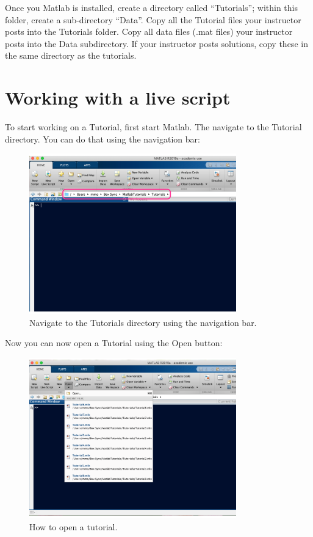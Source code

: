 \documentclass[11pt]{article}
\begin{document}
\vspace{2mm}
\noindent
Once you Matlab is installed,
create a directory called ``Tutorials'';
within this folder, create a sub-directory ``Data''.
Copy all the Tutorial files your instructor posts into the Tutorials folder. 
Copy all data files (.mat files) your instructor posts into the Data subdirectory.
If your instructor posts solutions,
copy these in the same directory as the tutorials.

\section{Working with a live script}
To start working on a Tutorial, first start Matlab.
The navigate to the Tutorial directory.
You can do that using the navigation bar:
\begin{figure}[h!]
\centering
\includegraphics[width=0.8\textwidth]{Navigate_Bar.pdf}
\caption{
Navigate to the Tutorials directory using the navigation bar.
}
\end{figure}


\vspace{2mm}
\noindent
Now you can now open a Tutorial using the Open button:
\begin{figure}[h!]
\centering
\includegraphics[width=0.8\textwidth]{Open.pdf}
\caption{
How to open a tutorial.
}
\end{figure}
\end{document}
